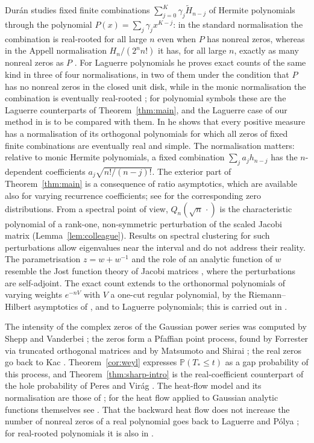 \documentclass[11pt]{amsart}
\theoremstyle{definition}
\theoremstyle{remark}
\numberwithin{equation}{section}
\newcommand{\PP}{\mathbb{P}}
\begin{document}
Dur\'an \cite{Du1} studies fixed finite combinations $\sum_{j=0}^{K}\gamma_j\widetilde H_{n-j}$ of Hermite polynomials through the polynomial $P(x)=\sum_j\gamma_jx^{K-j}$: in the standard normalisation the combination is real-rooted for all large $n$ even when $P$ has nonreal zeros, whereas in the Appell normalisation $H_n/(2^nn!)$ it has, for all large $n$, exactly as many nonreal zeros as $P$ \cite[Theorems~1.2 and~1.3]{Du1}. For Laguerre polynomials he proves exact counts of the same kind in three of four normalisations, in two of them under the condition that $P$ has no nonreal zeros in the closed unit disk, while in the monic normalisation the combination is eventually real-rooted \cite[Theorems~1.3--1.6]{Du3}; for polynomial symbols these are the Laguerre counterparts of Theorem~\ref{thm:main}, and the Laguerre case of our method in \cite{CompC} is to be compared with them. In \cite{Du2} he shows that every positive measure has a normalisation of its orthogonal polynomials for which all zeros of fixed finite combinations are eventually real and simple. The normalisation matters: relative to monic Hermite polynomials, a fixed combination $\sum_ja_jh_{n-j}$ has the $n$-dependent coefficients $a_j\sqrt{n!/(n-j)!}$. The exterior part of Theorem~\ref{thm:main} is a consequence of ratio asymptotics, which are available also for varying recurrence coefficients; see \cite{KVA} for the corresponding zero distributions. From a spectral point of view, $Q_n(\sqrt n\,\cdot)$ is the characteristic polynomial of a rank-one, non-symmetric perturbation of the scaled Jacobi matrix (Lemma~\ref{lem:colleague}). Results on spectral clustering for such perturbations \cite{GSC} allow eigenvalues near the interval and do not address their reality. The parametrisation $z=w+w^{-1}$ and the role of an analytic function of $w$ resemble the Jost function theory of Jacobi matrices \cite{DS}, where the perturbations are self-adjoint. The exact count extends to the orthonormal polynomials of varying weights $e^{-nV}$ with $V$ a one-cut regular polynomial, by the Riemann--Hilbert asymptotics of \cite{DKMVZ}, and to Laguerre polynomials; this is carried out in \cite{CompC}.

The intensity of the complex zeros of the Gaussian power series was computed by Shepp and Vanderbei \cite{SV}; the zeros form a Pfaffian point process, found by Forrester \cite{Fo} via truncated orthogonal matrices and by Matsumoto and Shirai \cite{MS}; the real zeros go back to Kac \cite{Ka}. Theorem~\ref{cor:weyl} expresses $\PP(T_*\le t)$ as a gap probability of this process, and Theorem~\ref{thm:sharp-intro} is the real-coefficient counterpart of the hole probability of Peres and Vir\'ag \cite{PV}. The heat-flow model and its normalisation are those of \cite{HHJK}; for the heat flow applied to Gaussian analytic functions themselves see \cite{HHJK2}. That the backward heat flow does not increase the number of nonreal zeros of a real polynomial goes back to Laguerre and P\'olya \cite{Ob}; for real-rooted polynomials it is also in \cite{IS}.
\end{document}

